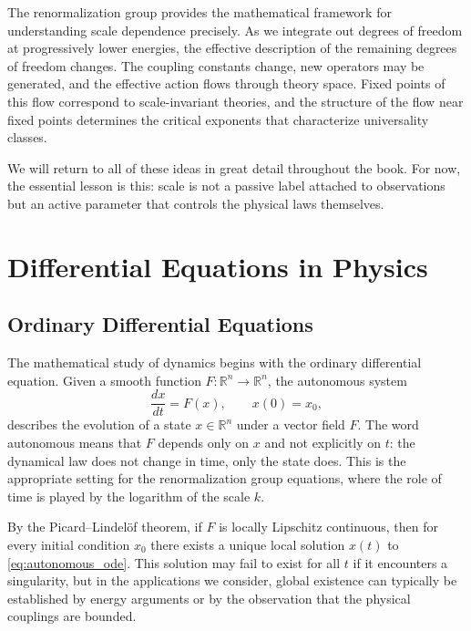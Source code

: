 \documentclass[11pt, twoside, openright]{book}
\theoremstyle{dotted}
\theoremstyle{definition}
\begin{document}
The renormalization group provides the mathematical framework for understanding
scale dependence precisely. As we integrate out degrees of freedom at progressively
lower energies, the effective description of the remaining degrees of freedom
changes. The coupling constants change, new operators may be generated, and the
effective action flows through theory space. Fixed points of this flow correspond
to scale-invariant theories, and the structure of the flow near fixed points
determines the critical exponents that characterize universality classes.

We will return to all of these ideas in great detail throughout the book. For now,
the essential lesson is this: scale is not a passive label attached to observations
but an active parameter that controls the physical laws themselves.

\chapter{Differential Equations in Physics}
\label{ch:odes}

\section{Ordinary Differential Equations}

The mathematical study of dynamics begins with the ordinary differential equation.
Given a smooth function $F: \mathbb{R}^n \to \mathbb{R}^n$, the autonomous system
\begin{equation}
  \frac{dx}{dt} = F(x), \qquad x(0) = x_0,
  \label{eq:autonomous_ode}
\end{equation}
describes the evolution of a state $x \in \mathbb{R}^n$ under a vector field $F$.
The word autonomous means that $F$ depends only on $x$ and not explicitly on $t$:
the dynamical law does not change in time, only the state does. This is the
appropriate setting for the renormalization group equations, where the role of
time is played by the logarithm of the scale $k$.

By the Picard–Lindelöf theorem, if $F$ is locally Lipschitz continuous, then for
every initial condition $x_0$ there exists a unique local solution $x(t)$ to
\eqref{eq:autonomous_ode}. This solution may fail to exist for all $t$ if it
encounters a singularity, but in the applications we consider, global existence
can typically be established by energy arguments or by the observation that the
physical couplings are bounded.
\end{document}
